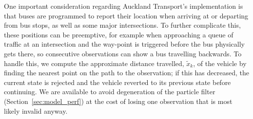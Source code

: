 One important consideration regarding Auckland Transport's \rt implementation is that
buses are programmed to report their location when arriving at or departing from
bus stops, as well as some major intersections.
To further complicate this,
these positions can be preemptive,
for example when approaching a queue of traffic at an intersection
and the way-point is triggered before the bus physically gets there,
so consecutive observations can show a bus travelling backwards.
To handle this, we compute the approximate distance travelled, $\tilde x_k$,
of the vehicle by finding the nearest point on the path to the observation;
if this has decreased, the current state is rejected and the vehicle reverted
to its previous state before continuing.
We are available to avoid degeneration of the particle filter (Section~\ref{sec:model_perf})
at the cost of losing one observation that is most likely invalid anyway.

